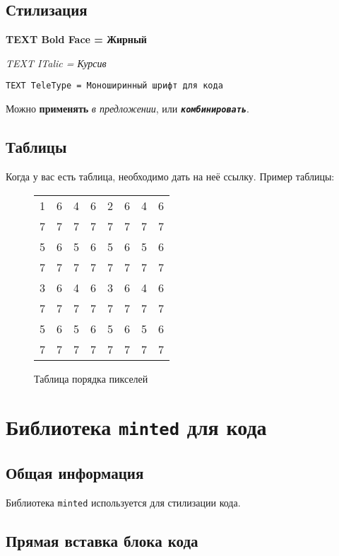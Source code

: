 \documentclass[a4paper,12pt]{report}
\begin{document}
\subsection{Стилизация}

\textbf{TEXT Bold Face = Жирный}

\textit{TEXT ITalic = Курсив}

\texttt{TEXT TeleType = Моноширинный шрифт для кода}

Можно \textbf{применять} \textit{в предложении}, или \texttt{\textit{\textbf{комбинировать}}}.

\subsection{Таблицы}

Когда у вас есть таблица, необходимо дать на неё ссылку.
Пример таблицы:

\begin{figure}[!ht]
\centering
\begin{tabular}{c c c c c c c c}
    1 & 6 & 4 & 6 & 2 & 6 & 4 & 6 \\
    7 & 7 & 7 & 7 & 7 & 7 & 7 & 7 \\
    5 & 6 & 5 & 6 & 5 & 6 & 5 & 6 \\
    7 & 7 & 7 & 7 & 7 & 7 & 7 & 7 \\
    3 & 6 & 4 & 6 & 3 & 6 & 4 & 6 \\
    7 & 7 & 7 & 7 & 7 & 7 & 7 & 7 \\
    5 & 6 & 5 & 6 & 5 & 6 & 5 & 6 \\
    7 & 7 & 7 & 7 & 7 & 7 & 7 & 7 \\
\end{tabular}
\caption{Таблица порядка пикселей}
\label{fig:pixel_order_table}
\end{figure}

\section{Библиотека \texttt{minted} для кода}

\subsection{Общая информация}

Библиотека \texttt{minted} используется для стилизации кода.

\subsection{Прямая вставка блока кода}
\end{document}
